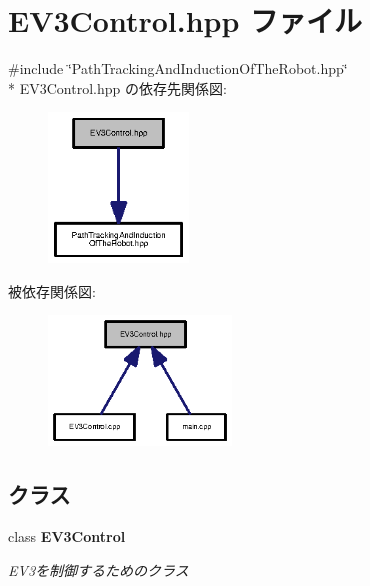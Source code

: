\section{E\-V3\-Control.\-hpp ファイル}
\label{_e_v3_control_8hpp}
{\ttfamily \#include \char`\"{}Path\-Tracking\-And\-Induction\-Of\-The\-Robot.\-hpp\char`\"{}}\\*
E\-V3\-Control.\-hpp の依存先関係図\-:\nopagebreak
\begin{figure}[H]
\begin{center}
\leavevmode
\includegraphics[width=106pt]{_e_v3_control_8hpp__incl}
\end{center}
\end{figure}
被依存関係図\-:\nopagebreak
\begin{figure}[H]
\begin{center}
\leavevmode
\includegraphics[width=138pt]{_e_v3_control_8hpp__dep__incl}
\end{center}
\end{figure}
\subsection*{クラス}
\begin{DoxyCompactItemize}
\item 
class {\bf E\-V3\-Control}
\begin{DoxyCompactList}\small\item\em E\-V3を制御するためのクラス \end{DoxyCompactList}\end{DoxyCompactItemize}
